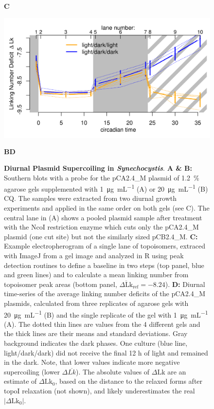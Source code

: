 \documentclass[10pt,a4]{article}
\newcommand{\ugml}{\micro\gram\per\milli\liter}
\newcommand{\scyst}{\textit{Synechocystis}}
\newcommand{\dlk}{\ensuremath{\Delta\text{Lk}}}
\newcommand{\dlkr}{\ensuremath{\Delta\text{Lk}_0}}
\begin{document}
\begin{figure}[ht!]
\begin{minipage}{.39\textwidth}
    \vspace{-.35cm}
    \textbf{C}
    
    \includegraphics[width=\textwidth]{figures/diurnal/linkingNumbers.png}
  \end{minipage}
  
  \vspace{-.5cm}
  \textbf{B}\hspace{.48\textwidth}\textbf{D}
  \vspace{.2cm}
  
  \caption{\textbf{Diurnal Plasmid Supercoiling in
      \scyst{}}. \textbf{A \& B:} Southern blots with a probe for the
    pCA2.4\_M plasmid of \SI{1.2}{\percent} agarose gels supplemented
    with \SI{1}{\ugml} (A) or \SI{20}{\ugml} (B) CQ. The samples were
    extracted from two diurnal growth experiments and applied in the
    same order on both gels (see C). The central lane in (A) shows a
    pooled plasmid sample after treatment with the NcoI restriction
    enzyme which cuts only the pCA2.4\_M plasmid (one cut site) but
    not the similarly sized pCB2.4\_M. \textbf{C:} Example
    electropherogram of a single lane of topoisomers, extraced with
    ImageJ from a gel image and analyzed in R using peak detection
    routines to define a baseline in two steps (top panel, blue and
    green lines) and to calculate a mean linking number from
    topoisomer peak areas (bottom panel,
    $\overline{\dlk}_\text{ref}=-8.24$).  \textbf{D:} Diurnal
    time-series of the average linking number deficits of the
    pCA2.4\_M plasmids, calculated from three replicates of agarose
    gels with \SI{20}{\ugml} (B) and the single replicate of the gel
    with \SI{1}{\ugml} (A).  The dotted thin lines are values from the
    4 different gels and the thick lines are their means and standard
    deviations.  Gray background indicates the dark phases. One
    culture (blue line, light/dark/dark) did not receive the final 12
    h of light and remained in the dark.  Note, that lower values
    indicate more negative supercoiling (lower $\Delta
    \overline{Lk}$). The absolute values of $\dlk$ are an estimate of
    $\dlkr$, based on the distance to the relaxed forms after topoI
    relaxation (not shown), and likely underestimates the real
    $|\dlkr|$.}
    \label{fig:blot} 
\end{figure}
\end{document}
